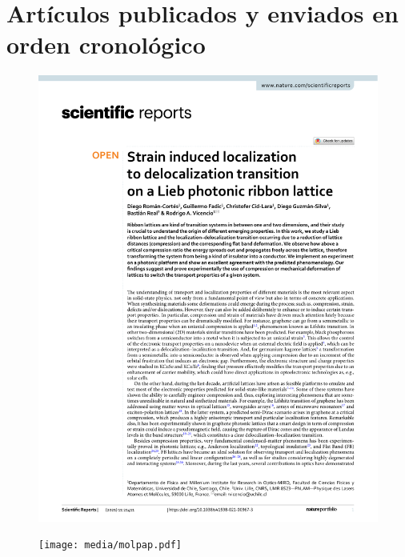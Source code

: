 \chapter{Artículos publicados y enviados en orden cronológico}
\begin{figure}[H]
	\centering
	\includegraphics[page=1, width=0.9\linewidth]{media/strainlieb.pdf}
\end{figure}
\newpage
\begin{figure}[H]
	\centering
	\texttt{[image: media/molpap.pdf]}
\end{figure}
\newpage
